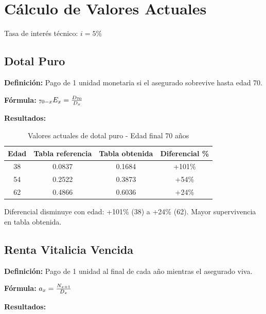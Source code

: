 
\section{Cálculo de Valores Actuales}

Tasa de interés técnico: $i = 5\%$

\subsection{ Dotal Puro}

\textbf{Definición:} Pago de 1 unidad monetaria si el asegurado sobrevive hasta edad 70.

\textbf{Fórmula:} ${}_{70-x}E_x = \frac{D_{70}}{D_{x}}$

\textbf{Resultados:}

\begin{table}[H]
\centering
\caption{Valores actuales de dotal puro - Edad final 70 años}
\label{tab:dotal_puro}
\begin{tabular}{cccc}
\toprule
\tableheadercolor
\textbf{Edad} & \textbf{Tabla referencia} & \textbf{Tabla obtenida} & \textbf{Diferencial \%} \\
\midrule
38 & 0.0837 & 0.1684 & +101\% \\
54 & 0.2522 & 0.3873 & +54\% \\
62 & 0.4866 & 0.6036 & +24\% \\
\bottomrule
\end{tabular}
\end{table}

Diferencial disminuye con edad: +101\% (38) a +24\% (62). Mayor supervivencia en tabla obtenida.

\subsection{Renta Vitalicia Vencida}

\textbf{Definición:} Pago de 1 unidad al final de cada año mientras el asegurado viva.

\textbf{Fórmula:} $a_x = \frac{N_{x+1}}{D_{x}}$

\textbf{Resultados:}

